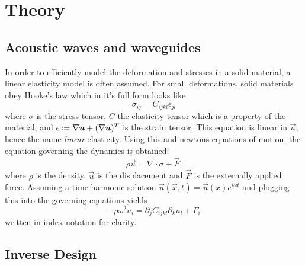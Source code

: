 \chapter{Theory}

\section{Acoustic waves and waveguides}

In order to efficiently model the deformation and stresses in a solid material,
a linear elasticity model is often assumed.
For small deformations, solid materials obey Hooke's law which in it's full form
looks like
\[
	\sigma_{ij} = C_{ijkl} \epsilon_{jl}
\]
where $\sigma$ is the stress tensor, $C$ the elasticity tensor which is a
property of the material, and 
$\epsilon \defeq \nabla \vec u + (\nabla \vec u)^T$
is the strain tensor.
This equation is linear in $\vec u$, hence the name \emph{linear} elasticity.
Using this and newtons equations of motion, the equation governing the dynamics
is obtained:
\[
	\rho \ddot{\vec{u}} = \nabla \cdot \sigma + \vec F.
\]
where $\rho$ is the density, $\vec{u}$ is the displacement and $\vec F$ is the
externally applied force.
Assuming a time harmonic solution
$\vec u(\vec x, t) = \vec u(x) e^{i \omega t}$ and plugging this into
the governing equations yields
\begin{equation}\label{eq:gov_eq}
	-\rho \omega^2 u_i = \partial_j C_{ijkl} \partial_k u_l + F_i
\end{equation}
written in index notation for clarity. 





\section{Inverse Design}

